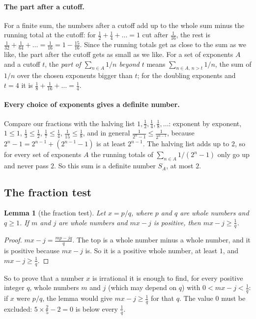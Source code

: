 \documentclass[10pt]{article}
\theoremstyle{plain}
\newtheorem{lemma}[theorem]{Lemma}
\theoremstyle{definition}
\theoremstyle{remark}
\begin{document}
\paragraph{The part after a cutoff.} For a finite sum, the numbers after a
cutoff add up to the whole sum minus the running total at the cutoff: for
$\tfrac12+\tfrac14+\dots=1$ cut after $\tfrac1{16}$, the rest is
$\tfrac1{32}+\tfrac1{64}+\dots=\tfrac1{16}=1-\tfrac{15}{16}$. Since the running
totals get as close to the sum as we like, the part after the cutoff gets as
small as we like. For a set of exponents $A$ and a cutoff $t$, the \emph{part
of $\sum_{n\in A}1/n$ beyond $t$} means $\sum_{n\in A,\,n>t}1/n$, the sum of
$1/n$ over the chosen exponents bigger than $t$; for the doubling exponents
and $t=4$ it is $\tfrac18+\tfrac1{16}+\dots=\tfrac14$.

\paragraph{Every choice of exponents gives a definite number.} Compare our
fractions with the halving list $1,\tfrac12,\tfrac14,\tfrac18,\dots$: exponent
by exponent, $1\le1$, $\tfrac13\le\tfrac12$, $\tfrac17\le\tfrac14$,
$\tfrac1{15}\le\tfrac18$, and in general $\tfrac1{2^n-1}\le\tfrac1{2^{n-1}}$,
because $2^n-1=2^{n-1}+(2^{n-1}-1)$ is at least $2^{n-1}$. The halving list adds
up to $2$, so for every set of exponents $A$ the running totals of
$\sum_{n\in A}1/(2^n-1)$ only go up and never pass $2$. So this sum is a
definite number $S_A$, at most $2$.

\subsection{The fraction test}\label{app:test}

\begin{lemma}[the fraction test]\label{lem:grid}
Let $x=p/q$, where $p$ and $q$ are whole numbers and $q\ge1$. If $m$ and $j$
are whole numbers and $mx-j$ is positive, then $mx-j\ge\tfrac1q$.
\end{lemma}

\begin{proof}
$mx-j=\tfrac{mp-jq}q$. The top is a whole number minus a whole number, and it
is positive because $mx-j$ is. So it is a positive whole number, at least $1$,
and $mx-j\ge\tfrac1q$.
\end{proof}

So to prove that a number $x$ is irrational it is enough to find, for every
positive integer $q$, whole numbers $m$ and $j$ (which may depend on $q$) with
$0<mx-j<\tfrac1q$: if $x$ were $p/q$, the lemma would give $mx-j\ge\tfrac1q$
for that $q$. The value $0$ must be excluded: $5\times\tfrac25-2=0$ is below
every $\tfrac1q$.
\end{document}
